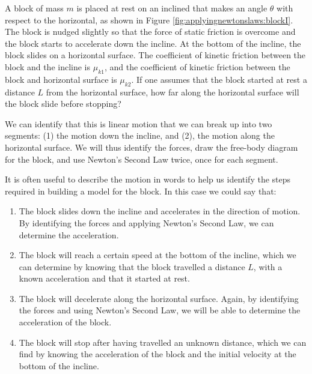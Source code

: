\begin{example}{A block of mass $m$ is placed at rest on an inclined that makes an angle $\theta$ with respect to the horizontal, as shown in Figure \ref{fig:applyingnewtonslaws:blockI}. The block is nudged slightly so that the force of static friction is overcome and the block starts to accelerate down the incline. At the bottom of the incline, the block slides on a horizontal surface. The coefficient of kinetic friction between the block and the incline is $\mu_{k1}$, and the coefficient of kinetic friction between the block and horizontal surface is $\mu_{k2}$. If one assumes that the block started at rest a distance $L$ from the horizontal surface, how far along the horizontal surface will the block slide before stopping?}


We can identify that this is linear motion that we can break up into two segments: (1) the motion down the incline, and (2), the motion along the horizontal surface. We will thus identify the forces, draw the free-body diagram for the block, and use Newton's Second Law twice, once for each segment.

It is often useful to describe the motion in words to help us identify the steps required in building a model for the block. In this case we could say that:
\begin{enumerate}
\item The block slides down the incline and accelerates in the direction of motion. By identifying the forces and applying Newton's Second Law, we can determine the acceleration.
\item The block will reach a certain speed at the bottom of the incline, which we can determine by knowing that the block travelled a distance $L$, with a known acceleration and that it started at rest.
\item The block will decelerate along the horizontal surface. Again, by identifying the forces and using Newton's Second Law, we will be able to determine the acceleration of the block.
\item The block will stop after having travelled an unknown distance, which we can find by knowing the acceleration of the block and the initial velocity at the bottom of the incline.
\end{enumerate}


\end{example}
